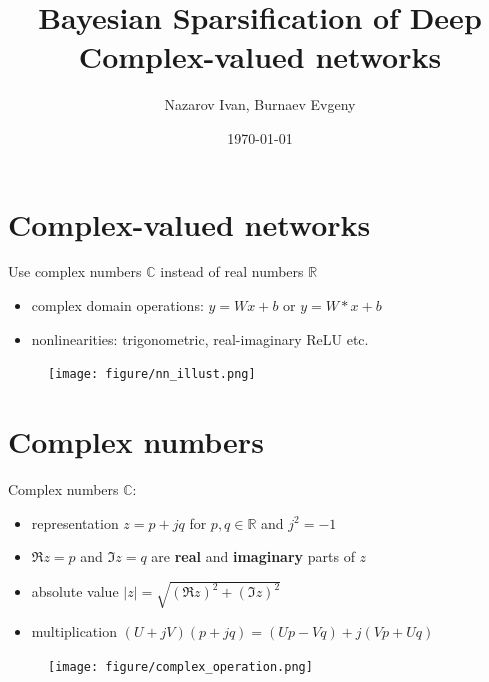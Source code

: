 \documentclass{beamer}
\title[Exam]{Bayesian Sparsification of Deep Complex-valued networks}
\author[Nazarov I., Burnaev E.]{Nazarov Ivan, Burnaev Evgeny}
\date{\today}
\institute[Skoltech]{Skolkovo Institute of Science and Technology}
\newcommand{\real}{\mathbb{R}}
\newcommand{\cplx}{\mathbb{C}}
\begin{document}
\begin{frame}
  \titlepage
\end{frame}

\section{Complex-valued networks} %
\label{sec:complex_valued_networks}

\begin{frame}[c]{\insertsection}
  \bigskip
  Use complex numbers $\cplx$ instead of real numbers $\real$
  \begin{itemize}
    \item complex domain operations: $y = W x + b$ or $y = W \ast x + b$
    \item nonlinearities: trigonometric, real-imaginary ReLU etc.
  \end{itemize}

  \begin{figure}
    \centering
    \texttt{[image: figure/nn\_illust.png]}
  \end{figure}

\end{frame}


\section{Complex numbers} %
\label{sec:complex_numbers}

\begin{frame}[c]{\insertsection}

  Complex numbers $\cplx$:
  \begin{itemize}
    \item representation $
      z = p + j q
    $ for $p, q \in \real$ and $j^2 = -1$
    \item $\Re{z} = p$ and $\Im{z} = q$ are \textbf{real} and \textbf{imaginary}
    parts of $z$

    \medskip
    \item absolute value $
      \lvert z \rvert = \sqrt{(\Re{z})^2 + (\Im{z})^2}
    $
    \bigskip
    \item multiplication $
      (U + j V) (p + j q)
          = (U p - V q) + j(V p + U q)
    $
  \end{itemize}

  \begin{figure}
    \texttt{[image: figure/complex\_operation.png]}
  \end{figure}
\end{frame}
\end{document}
